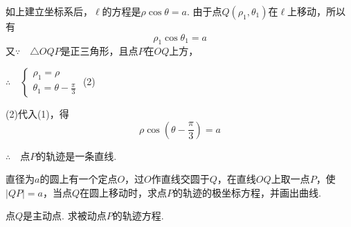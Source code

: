 \begin{solution}
如上建立坐标系后，$\ell$的方程是$\rho\cos\theta=a$. 由于点$Q(\rho_1,\theta_1)$在$\ell$上移动，所以有
\begin{equation}
    \rho_1\cos \theta_1=a \tag{1}
\end{equation}
又$\because\quad \triangle OQ{P}$是正三角形，且点$P$在$OQ$上方，

$\therefore \quad \begin{cases}
    \rho_1=\rho\\ \theta_1=\theta-\frac{\pi}{3}
\end{cases} $ \hfill(2)

(2)代入(1)，得
\[\rho\cos\left(\theta-\frac{\pi}{3}\right)=a\]

$\therefore\quad $点$P$的轨迹是一条直线.
\end{solution}

\begin{example}
    直径为$a$的圆上有一个定点$O$，过$O$作直线交圆于$Q$，在直线$OQ$上取一点$P$，使$|QP|=a$，当点$Q$在圆上移动时，求点$P$的轨迹的极坐标方程，并画出曲线.
\end{example}

\begin{analyze}
点$Q$是主动点. 求被动点$P$的轨迹方程.
\end{analyze}

